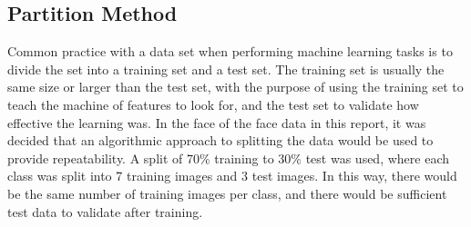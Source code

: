 \documentclass[a4paper, 10pt, conference]{ieeeconf}
\begin{document}
\subsection{Partition Method}

Common practice with a data set when performing machine learning tasks is to divide the set into a training set and a test set. The training set is usually the same size or larger than the test set, with the purpose of using the training set to teach the machine of features to look for, and the test set to validate how effective the learning was. In the face of the face data in this report, it was decided that an algorithmic approach to splitting the data would be used to provide repeatability. A split of 70\% training to 30\% test was used, where each class was split into 7 training images and 3 test images. In this way, there would be the same number of training images per class, and there would be sufficient test data to validate after training.


\end{document}
